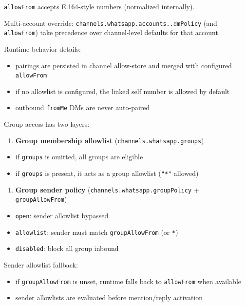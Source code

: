 \texttt{allowFrom} accepts E.164-style numbers (normalized internally).

Multi-account override: \texttt{channels.whatsapp.accounts..dmPolicy} (and \texttt{allowFrom}) take precedence over channel-level defaults for that account.

Runtime behavior details:

\begin{itemize}
  \item pairings are persisted in channel allow-store and merged with configured \texttt{allowFrom}
  \item if no allowlist is configured, the linked self number is allowed by default
  \item outbound \texttt{fromMe} DMs are never auto-paired
\end{itemize}



Group access has two layers:

\begin{enumerate}
  \item \textbf{Group membership allowlist} (\texttt{channels.whatsapp.groups})
\end{enumerate}

\begin{itemize}
  \item if \texttt{groups} is omitted, all groups are eligible
  \item if \texttt{groups} is present, it acts as a group allowlist (\texttt{"*"} allowed)
\end{itemize}


\begin{enumerate}
  \item \textbf{Group sender policy} (\texttt{channels.whatsapp.groupPolicy} + \texttt{groupAllowFrom})
\end{enumerate}

\begin{itemize}
  \item \texttt{open}: sender allowlist bypassed
  \item \texttt{allowlist}: sender must match \texttt{groupAllowFrom} (or \texttt{*})
  \item \texttt{disabled}: block all group inbound
\end{itemize}


Sender allowlist fallback:

\begin{itemize}
  \item if \texttt{groupAllowFrom} is unset, runtime falls back to \texttt{allowFrom} when available
  \item sender allowlists are evaluated before mention/reply activation
\end{itemize}


